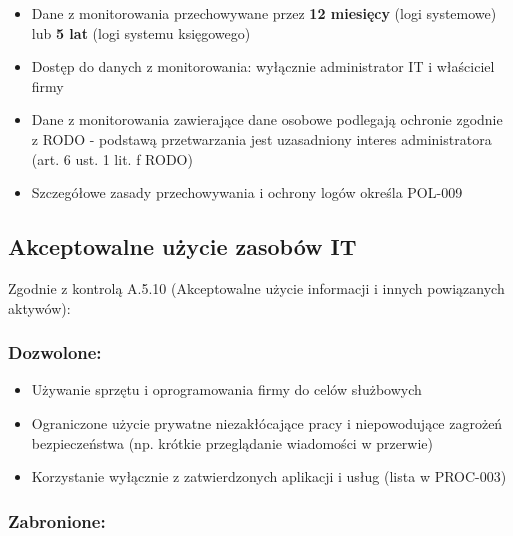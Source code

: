 \documentclass[12pt,a4paper]{article}
\providecommand{\tightlist}{\setlength{\itemsep}{0pt}\setlength{\parskip}{0pt}}
\begin{document}
\begin{itemize}
\tightlist
\item
  Dane z monitorowania przechowywane przez \textbf{12 miesięcy} (logi systemowe) lub \textbf{5 lat} (logi systemu księgowego)
\item
  Dostęp do danych z monitorowania: wyłącznie administrator IT i właściciel firmy
\item
  Dane z monitorowania zawierające dane osobowe podlegają ochronie zgodnie z RODO - podstawą przetwarzania jest uzasadniony interes administratora (art. 6 ust. 1 lit. f RODO)
\item
  Szczegółowe zasady przechowywania i ochrony logów określa POL-009
\end{itemize}

\subsection{Akceptowalne użycie zasobów IT}\label{akceptowalne}

Zgodnie z kontrolą A.5.10 (Akceptowalne użycie informacji i innych powiązanych aktywów):

\subsubsection{Dozwolone:}\label{dozwolone}

\begin{itemize}
\tightlist
\item
  Używanie sprzętu i oprogramowania firmy do celów służbowych
\item
  Ograniczone użycie prywatne niezakłócające pracy i niepowodujące zagrożeń bezpieczeństwa (np. krótkie przeglądanie wiadomości w przerwie)
\item
  Korzystanie wyłącznie z zatwierdzonych aplikacji i usług (lista w PROC-003)
\end{itemize}

\subsubsection{ Zabronione:}\label{zabronione}
\end{document}
